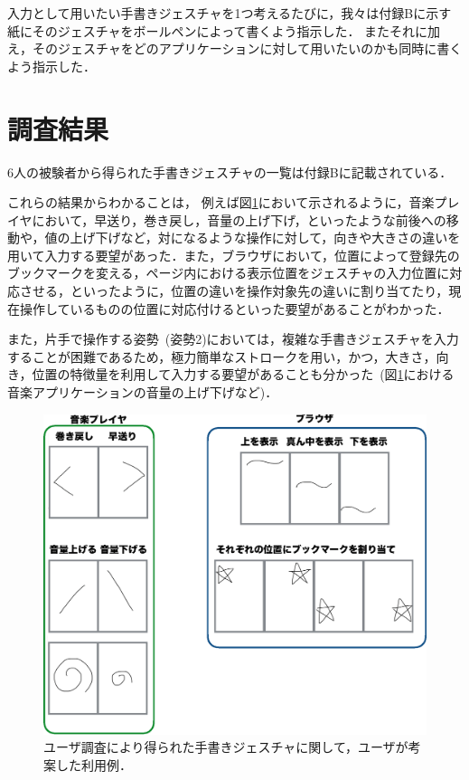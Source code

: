 入力として用いたい手書きジェスチャを1つ考えるたびに，我々は付録Bに示す紙にそのジェスチャをボールペンによって書くよう指示した．
またそれに加え，そのジェスチャをどのアプリケーションに対して用いたいのかも同時に書くよう指示した．


\section{調査結果}
6人の被験者から得られた手書きジェスチャの一覧は付録Bに記載されている．

これらの結果からわかることは，
例えば図\ref{fig:elicitation_example}において示されるように，音楽プレイヤにおいて，早送り，巻き戻し，音量の上げ下げ，といったような前後への移動や，値の上げ下げなど，対になるような操作に対して，向きや大きさの違いを用いて入力する要望があった．また，ブラウザにおいて，位置によって登録先のブックマークを変える，ページ内における表示位置をジェスチャの入力位置に対応させる，といったように，位置の違いを操作対象先の違いに割り当てたり，現在操作しているものの位置に対応付けるといった要望があることがわかった．

また，片手で操作する姿勢~(姿勢2)においては，複雑な手書きジェスチャを入力することが困難であるため，極力簡単なストロークを用い，かつ，大きさ，向き，位置の特徴量を利用して入力する要望があることも分かった~(図\ref{fig:elicitation_example}における音楽アプリケーションの音量の上げ下げなど)．

\begin{figure} [t]
 \begin{center}
  \includegraphics [width=0.7\columnwidth]{img/elicitation_example.eps}
  \caption{ユーザ調査により得られた手書きジェスチャに関して，ユーザが考案した利用例．}
  \label{fig:elicitation_example}
 \end{center}
\end{figure}

